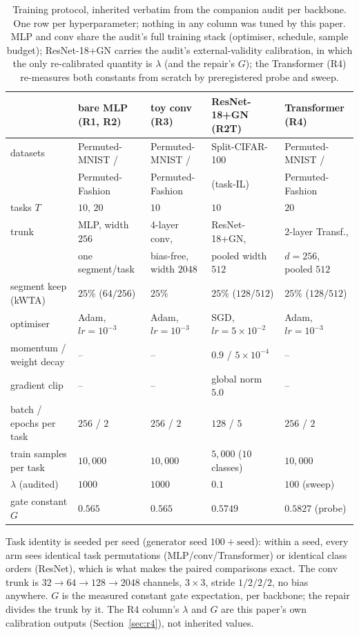 \documentclass[10pt]{article}
\begin{document}
\begin{table}[t]
\centering
\caption{Training protocol, inherited verbatim from the companion audit
per backbone. One row per hyperparameter; nothing in any column was tuned
by this paper. MLP and conv share the audit's full training stack
(optimiser, schedule, sample budget); ResNet-18+GN carries the audit's
external-validity calibration, in which the only re-calibrated quantity is
$\lambda$ (and the repair's $G$); the Transformer (R4) re-measures both
constants from scratch by preregistered probe and sweep.}
\label{tab:protocol}
\footnotesize
\setlength{\tabcolsep}{3pt}
\begin{tabular}{lllll}
\toprule
 & bare MLP (R1, R2) & toy conv (R3) & ResNet-18+GN (R2T) & Transformer (R4) \\
\midrule
datasets & Permuted-MNIST / & Permuted-MNIST / & Split-CIFAR-100 & Permuted-MNIST / \\
         & Permuted-Fashion & Permuted-Fashion & (task-IL) & Permuted-Fashion \\
tasks $T$ & $10,\,20$ & $10$ & $10$ & $20$ \\
trunk & MLP, width $256$ & 4-layer conv, & ResNet-18+GN, & 2-layer Transf., \\
      & one segment/task & bias-free, width $2048$ & pooled width $512$ & $d{=}256$, pooled $512$ \\
segment keep (kWTA) & $25\%$ ($64/256$) & $25\%$ & $25\%$ ($128/512$) & $25\%$ ($128/512$) \\
optimiser & Adam, $lr{=}10^{-3}$ & Adam, $lr{=}10^{-3}$ & SGD, $lr{=}5{\times}10^{-2}$ & Adam, $lr{=}10^{-3}$ \\
momentum / weight decay & -- & -- & $0.9$ / $5{\times}10^{-4}$ & -- \\
gradient clip & -- & -- & global norm $5.0$ & -- \\
batch / epochs per task & $256$ / $2$ & $256$ / $2$ & $128$ / $5$ & $256$ / $2$ \\
train samples per task & $10{,}000$ & $10{,}000$ & $5{,}000$ ($10$ classes) & $10{,}000$ \\
$\lambda$ (audited) & $1000$ & $1000$ & $0.1$ & $100$ (sweep) \\
gate constant $G$ & $0.565$ & $0.565$ & $0.5749$ & $0.5827$ (probe) \\
\bottomrule
\end{tabular}

\vspace{2pt}
\raggedright\footnotesize Task identity is seeded per seed (generator seed
$100{+}\text{seed}$): within a seed, every arm sees identical task
permutations (MLP/conv/Transformer) or identical class orders (ResNet),
which is what makes the paired comparisons exact. The conv trunk is
$32{\to}64{\to}128{\to}2048$ channels, $3{\times}3$, stride
$1/2/2/2$, no bias anywhere. $G$ is the measured constant gate
expectation, per backbone; the repair divides the trunk by it. The R4
column's $\lambda$ and $G$ are this paper's own calibration outputs
(Section~\ref{sec:r4}), not inherited values.
\end{table}
\end{document}
